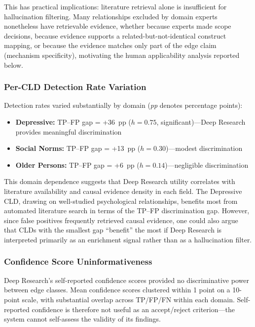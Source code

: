 This has practical implications: literature retrieval alone is insufficient for hallucination filtering. Many relationships excluded by domain experts nonetheless have retrievable evidence, whether because experts made scope decisions, because evidence supports a related-but-not-identical construct mapping, or because the evidence matches only part of the edge claim (mechanism specificity), motivating the human applicability analysis reported below.

\subsubsection{Per-CLD Detection Rate Variation}

Detection rates varied substantially by domain (\textit{pp} denotes percentage points):
\begin{itemize}[noitemsep]
    \item \textbf{Depressive:} TP--FP gap = +36~pp ($h=0.75$, significant)---Deep Research provides meaningful discrimination
    \item \textbf{Social Norms:} TP--FP gap = +13~pp ($h=0.30$)---modest discrimination
    \item \textbf{Older Persons:} TP--FP gap = +6~pp ($h=0.14$)---negligible discrimination
\end{itemize}

This domain dependence suggests that Deep Research utility correlates with literature availability and causal evidence density in each field. The Depressive CLD, drawing on well-studied psychological relationships, benefits most from automated literature search in terms of the TP--FP discrimination gap. However, since false positives frequently retrieved causal evidence, one could also argue that CLDs with the smallest gap ``benefit'' the most if Deep Research is interpreted primarily as an enrichment signal rather than as a hallucination filter.

\subsubsection{Confidence Score Uninformativeness}

Deep Research's self-reported confidence scores provided no discriminative power between edge classes. Mean confidence scores clustered within 1 point on a 10-point scale, with substantial overlap across TP/FP/FN within each domain. Self-reported confidence is therefore not useful as an accept/reject criterion---the system cannot self-assess the validity of its findings.

